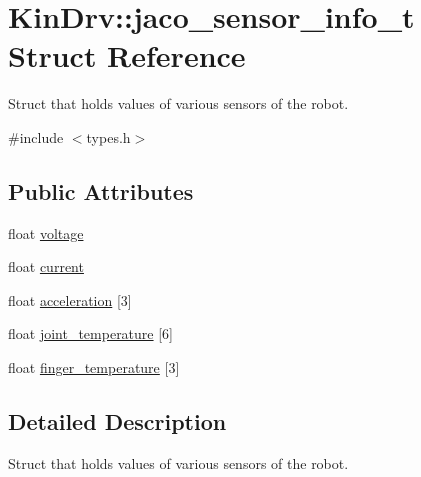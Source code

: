 \hypertarget{structKinDrv_1_1jaco__sensor__info__t}{\section{Kin\+Drv\+:\+:jaco\+\_\+sensor\+\_\+info\+\_\+t Struct Reference}
\label{structKinDrv_1_1jaco__sensor__info__t}
}


Struct that holds values of various sensors of the robot.  




{\ttfamily \#include $<$types.\+h$>$}

\subsection*{Public Attributes}
\begin{DoxyCompactItemize}
\item 
float \hyperlink{structKinDrv_1_1jaco__sensor__info__t_a693b9eeab48826e3406c253adc56e5ef}{voltage}
\item 
float \hyperlink{structKinDrv_1_1jaco__sensor__info__t_aabc09f5743bec6756dc01a551ea8b9e0}{current}
\item 
float \hyperlink{structKinDrv_1_1jaco__sensor__info__t_ae8fbd5b747a55c117509eb6a436b61c2}{acceleration} \mbox{[}3\mbox{]}
\item 
float \hyperlink{structKinDrv_1_1jaco__sensor__info__t_a869621af68be9e5dca47b564183d73fd}{joint\+\_\+temperature} \mbox{[}6\mbox{]}
\item 
float \hyperlink{structKinDrv_1_1jaco__sensor__info__t_af71911fccee90d67d7ca00d74ef6bbef}{finger\+\_\+temperature} \mbox{[}3\mbox{]}
\end{DoxyCompactItemize}


\subsection{Detailed Description}
Struct that holds values of various sensors of the robot. 

